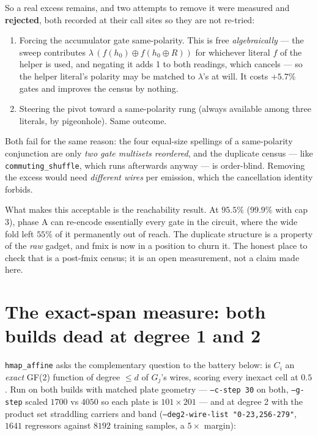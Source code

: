 \documentclass[11pt]{article}
\newcommand{\xor}{\oplus}
\newcommand{\code}[1]{\texttt{#1}}
\begin{document}
So a real excess remains, and two attempts to remove it were measured and
\textbf{rejected}, both recorded at their call sites so they are not re-tried:

\begin{enumerate}
  \item Forcing the accumulator gate same-polarity. This is free
        \emph{algebraically} --- the sweep contributes
        $\lambda\,(f(h_0) \xor f(h_0 \xor R))$ for whichever literal $f$ of the
        helper is used, and negating it adds 1 to both readings, which cancels
        --- so the helper literal's polarity may be matched to $\lambda$'s at
        will. It costs $+5.7\%$ gates and improves the census by nothing.
  \item Steering the pivot toward a same-polarity rung (always available among
        three literals, by pigeonhole). Same outcome.
\end{enumerate}

Both fail for the same reason: the four equal-size spellings of a
same-polarity conjunction are only \emph{two gate multisets reordered}, and the
duplicate census --- like \code{commuting\_shuffle}, which runs afterwards
anyway --- is order-blind. Removing the excess would need \emph{different
wires} per emission, which the cancellation identity forbids.

What makes this acceptable is the reachability result. At $95.5\%$ ($99.9\%$
with cap 3), phase A can re-encode essentially every gate in the circuit, where
the wide fold left $55\%$ of it permanently out of reach. The duplicate
structure is a property of the \emph{raw} gadget, and fmix is now in a position
to churn it. The honest place to check that is a post-fmix census; it is an
open measurement, not a claim made here.

\section{The exact-span measure: both builds dead at degree 1 and 2}

\code{hmap\_affine} asks the complementary question to the battery below: is
$C_i$ an \emph{exact} GF(2) function of degree $\le d$ of $G_j$'s wires,
scoring every inexact cell at $0.5$. Run on both builds with matched plate
geometry --- \code{--c-step 30} on both, \code{--g-step} scaled $1700$ vs
$4050$ so each plate is $101 \times 201$ --- and at degree 2 with the product
set straddling carriers and band (\code{--deg2-wire-list "0-23,256-279"},
$1641$ regressors against $8192$ training samples, a $5\times$ margin):
\end{document}
